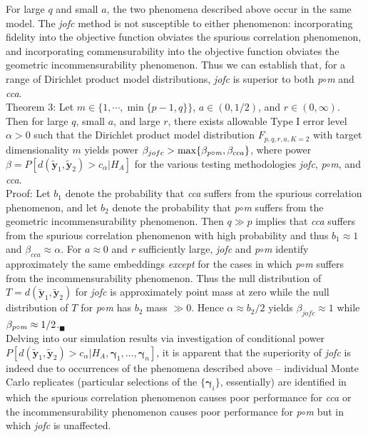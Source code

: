 \documentclass[12pt,xcolor]{article}
\newcommand{\1}{\ensuremath{\mbox{{\bf 1}}}}
\begin{document}
For large $q$ and small $a$, the two phenomena described above occur in the same model.
The {\it jofc} method is not susceptible to either phenomenon:
incorporating fidelity into the objective function obviates the spurious correlation phenomenon, and
incorporating commensurability into the objective function obviates the geometric incommensurability phenomenon.
Thus we can establish that,
for a range of Dirichlet product model distributions, {\em jofc} is superior to both {\it p}$\circ${\it m} and {\em cca}.
\\

Theorem 3: Let $m \in \{1,\cdots,\min\{p-1,q\}\}$, $a \in (0,1/2)$, and $r \in (0,\infty)$.
Then for large $q$, small $a$, and large $r$,
there exists allowable Type I error level $\alpha > 0$
such that the Dirichlet product model distribution $F_{p,q,r,a,K=2}$ with target dimensionality $m$
yields power $\beta_{jofc} > \max\{\beta_{\protect{{\it p}\circ{\it m}}},\beta_{cca}\}$,
where power $\beta = P[d(\widetilde{\bm{y}}_1,\widetilde{\bm{y}}_2)>c_{\alpha} | H_A]$
for the various testing methodologies {\em jofc}, {\it p}$\circ${\it m}, and {\em cca}.
\\

Proof:
Let $b_1$ denote the probability that {\em cca}
suffers from the spurious correlation phenomenon,
and let $b_2$ denote the probability that {\it p}$\circ${\it m}
suffers from the geometric incommensurability phenomenon.
Then $q \gg p$ implies that {\em cca} suffers from the spurious correlation phenomenon
with high probability and thus $b_1 \approx 1$ and $\beta_{cca} \approx \alpha$.
For $a \approx 0$ and $r$ sufficiently large,
{\em jofc} and {\it p}$\circ${\it m} identify approximately the same embeddings
{\em except} for the cases in which
 {\it p}$\circ${\it m} suffers from the incommensurability phenomenon.
 Thus the null distribution of $T=d(\widetilde{\bm{y}}_1,\widetilde{\bm{y}}_2)$ for {\em jofc} is approximately point mass at zero
while the null distribution of $T$ for {\it p}$\circ${\it m} has $b_2$ mass $\gg 0$.
Hence $\alpha \approx b_2/2$ yields
$\beta_{jofc} \approx 1$
while $\beta_{\protect{{\it p}\circ{\it m}}} \approx 1/2$.$_\blacksquare$
\\

Delving into our simulation results via investigation of conditional power
$P[d(\widetilde{\bm{y}}_1,\widetilde{\bm{y}}_2)>c_{\alpha} | H_A,\bm{\gamma}_1,\ldots,\bm{\gamma}_n]$,
it is apparent that the superiority of {\em jofc}
is indeed due to occurrences of the phenomena described above --
individual Monte Carlo replicates (particular selections of the $\{\bm{\gamma}_i\}$, essentially)
are identified in which the spurious correlation phenomenon causes poor performance for {\it cca}
or the incommensurability phenomenon causes poor performance for {\it p}$\circ${\it m}
but in which {\em jofc} is unaffected.
\end{document}
